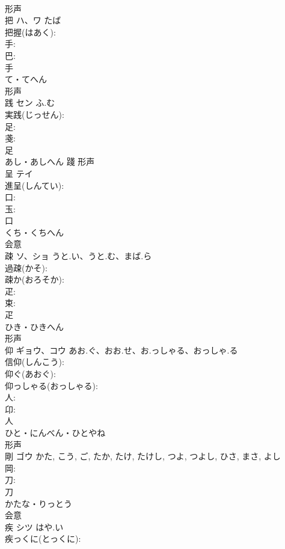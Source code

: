 \documentclass[8pt]{extreport}
\begin{document}
\begin{CJK}{UTF8}{min}
\\	形声 
\\	把	ハ、ワ		たば	
\\	把握(はあく): 
\\	手: 
\\	巴: 
\\	手	
\\	て・てへん	
\\	形声 
\\	践	セン	ふ.む		
\\	実践(じっせん): 
\\	足: 
\\	戔: 
\\	足	
\\	あし・あしへん	踐	形声 
\\	呈	テイ			
\\	進呈(しんてい): 
\\	口: 
\\	玉: 
\\	口	
\\	くち・くちへん	
\\	会意 
\\	疎	ソ、ショ	うと.い、うと.む、まば.ら		
\\	過疎(かそ): 
\\	疎か(おろそか): 
\\	疋: 
\\	束: 
\\	疋	
\\	ひき・ひきへん	
\\	形声 
\\	仰	ギョウ、コウ	あお.ぐ、おお.せ、お.っしゃる、おっしゃ.る		
\\	信仰(しんこう): 
\\	仰ぐ(あおぐ): 
\\	仰っしゃる(おっしゃる): 
\\	人: 
\\	卬: 
\\	人	
\\	ひと・にんべん・ひとやね	
\\	形声 
\\	剛	ゴウ		かた, こう, ご, たか, たけ, たけし, つよ, つよし, ひさ, まさ, よし	
\\	岡: 
\\	刀: 
\\	刀	
\\	かたな・りっとう	
\\	会意 
\\	疾	シツ	はや.い		
\\	疾っくに(とっくに): 

\end{CJK}
\end{document}
